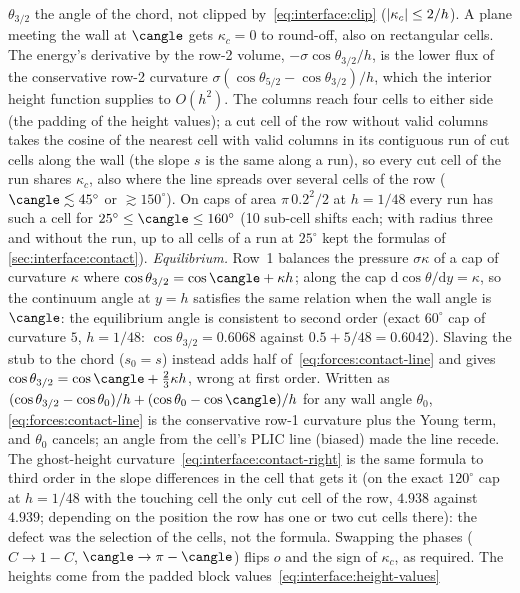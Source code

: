 $\theta_{3/2}$ the angle of the chord, not clipped by~\cref{eq:interface:clip}
($\left\lvert \kappa_c \right\rvert\le2/h$). A plane meeting the wall at $\cangle$ gets
$\kappa_c=0$ to round-off, also on rectangular cells. The energy's
derivative by the row-2 volume, $-\sigma\cos\theta_{3/2}/h$, is the lower
flux of the conservative row-2 curvature
$\sigma(\cos\theta_{5/2}-\cos\theta_{3/2})/h$, which the interior height
function supplies to $O(h^2)$. The columns reach four cells to either side
(the padding of the height values); a cut cell of the row without valid
columns takes the cosine of the nearest cell with valid columns in its
contiguous run of cut cells along the wall (the slope $s$ is the same along a
run), so every cut cell of the run shares $\kappa_c$, also where the line
spreads over several cells of the row ($\cangle\lesssim45^\circ$ or
$\gtrsim150^\circ$). On caps of area $\pi\,0.2^2/2$ at $h=1/48$ every run has
such a cell for $25^\circ\le\cangle\le160^\circ$ (10 sub-cell shifts each; with
radius three and without the run, up to all cells of a run at $25^\circ$ kept
the formulas of \cref{sec:interface:contact}).
\emph{Equilibrium.} Row~1 balances the pressure $\sigma\kappa$ of a cap of
curvature $\kappa$ where $\cos\theta_{3/2}=\cos\cangle+\kappa h$; along the
cap $\mathrm d\cos\theta/\mathrm dy=\kappa$, so the continuum angle at
$y=h$ satisfies the same relation when the wall angle is $\cangle$: the
equilibrium angle is consistent to second order (exact $60^\circ$ cap of
curvature $5$, $h=1/48$: $\cos\theta_{3/2}=0.6068$ against
$0.5+5/48=0.6042$). Slaving the stub to the chord ($s_0=s$) instead adds half
of~\cref{eq:forces:contact-line} and gives
$\cos\theta_{3/2}=\cos\cangle+\frac23\kappa h$, wrong at first order. Written
as $(\cos\theta_{3/2}-\cos\theta_0)/h+(\cos\theta_0-\cos\cangle)/h$ for any wall
angle $\theta_0$, \cref{eq:forces:contact-line} is the conservative
row-1 curvature plus the Young term, and $\theta_0$ cancels; an angle from the
cell's PLIC line (biased) made the line recede. The ghost-height
curvature~\cref{eq:interface:contact-right} is the same formula to third
order in the slope differences in the cell that gets it (on the exact
$120^\circ$ cap at $h=1/48$ with the touching cell the only cut cell of the
row, $4.938$ against $4.939$; depending on the position the row has one or
two cut cells there): the defect was the
selection of the cells, not the formula. Swapping the phases ($C\to1-C$,
$\cangle\to\pi-\cangle$) flips $o$ and the sign of $\kappa_c$, as required.
The heights come from the padded block values~\cref{eq:interface:height-values}
